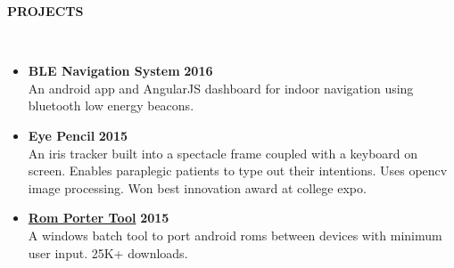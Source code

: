 \documentclass[a4paper,10pt]{article}
\newcommand{\lsep}{-0.5cm}
\newcommand{\resheading}[1]{{\small \colorbox{mygrey}{\begin{minipage}{0.975\textwidth}{\textbf{\uppercase{#1} \vphantom{p\^{E}}}}\end{minipage}}}}
\newcommand{\when}[1]{\hfill \textbf{#1}}
\newenvironment{noSepItemize}
{ \begin{itemize}
    \setlength{\itemsep}{1pt}
    \setlength{\parskip}{0pt}
    \setlength{\parsep}{0pt}     }
{ \end{itemize}                  }
\begin{document}
\resheading{\textbf{PROJECTS} }\\[\lsep]
\begin{noSepItemize}
\item \textbf{BLE Navigation System} \when{2016}\\
	An android app and AngularJS dashboard for indoor navigation using bluetooth low energy beacons. 
\item \textbf{Eye Pencil} \when{2015}\\
	An iris tracker built into a spectacle frame coupled with a keyboard on screen. Enables paraplegic patients to type out their intentions. Uses opencv image processing. Won best innovation award at college expo.
\item \textbf{\href{http://forum.xda-developers.com/showthread.php?t=2276871}{Rom Porter Tool}} \when{2015}\\
	A windows batch tool to port android roms between devices with minimum user input. 25K+ downloads.
\end{noSepItemize}
\end{document}
